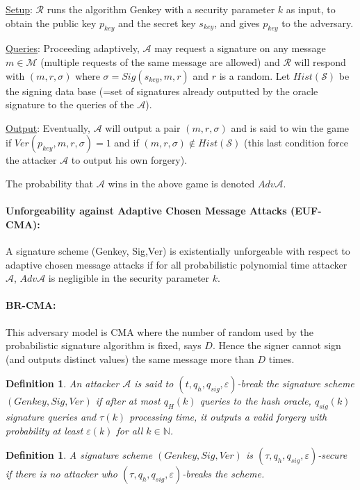 \documentclass[a4paper,11pt]{article}
\newtheorem{definition}[theorem]{Definition}
\begin{document}
\underline{Setup}: $\mathcal{R}$ runs the algorithm Genkey with a security parameter $k$ as input, to obtain the public key $p_{key}$ and the secret key $s_{key}$, and gives $p_{key}$ to the adversary.

\underline{Queries}: Proceeding adaptively, $\mathcal{A}$ may request a signature on any message  $m \in  \mathcal{M}$
 (multiple requests of the same message are allowed) and $\mathcal{R}$ will respond with $(m, r,  \sigma)$ where $\sigma= Sig(s_{key}, m, r)$ and $r$ is a random. Let $Hist(\mathcal{S})$ be the signing data base (=set of signatures already outputted by the oracle signature to the queries of the  $\mathcal{A}$).

\underline{Output}: Eventually, $\mathcal{A}$ will output a pair $(m, r,  \sigma)$ and is said to win the game
 if $Ver(p_{key}, m, r, \sigma)=1$ and if $ (m, r,  \sigma) \notin Hist(\mathcal{S})$ (this last condition force the attacker $\mathcal{A}$ to output his own forgery).
 
 The probability that  $\mathcal{A}$ wins in the above game is denoted  $Adv\mathcal{A}$.
 
 \paragraph{Unforgeability against Adaptive Chosen Message Attacks (EUF-CMA):}  A signature scheme (Genkey, Sig,Ver)
 is existentially unforgeable with respect to adaptive chosen message attacks if for all probabilistic polynomial
  time attacker $\mathcal{A}$, $Adv\mathcal{A}$ is negligible in  the security parameter $k$.
 
 \paragraph{BR-CMA:} This adversary model is CMA where the number of random used by the probabilistic signature algorithm is fixed, says $D$. Hence the signer cannot sign (and outputs distinct values) the same message more than $D$ times.

\begin{definition}
An attacker $\mathcal{A}$ is said to $(t,q_{h},q_{sig},\varepsilon)$-break the signature scheme $(Genkey,Sig,Ver)$ if after at most $q_H(k)$ queries to the hash oracle, $q_{sig}(k)$ signature queries and $\tau(k)$ processing time, it outputs a valid forgery with probability at least $\varepsilon(k)$ for all $k\in \mathbb{N}$.
\end{definition}
\begin{definition}
A signature scheme  $(Genkey,Sig,Ver)$ is $(\tau,q_{h},q_{sig},\varepsilon)$-secure if there is no attacker who $(\tau,q_{h},q_{sig},\varepsilon)$-breaks the scheme.
\end{definition}
\end{document}
